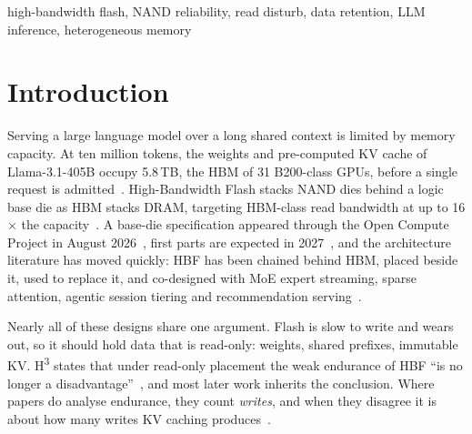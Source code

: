 \documentclass[conference,10pt]{IEEEtran}
\newcommand{\Hthree}{H\textsuperscript{3}}
\begin{document}
\begin{IEEEkeywords}
high-bandwidth flash, NAND reliability, read disturb, data retention, LLM
inference, heterogeneous memory
\end{IEEEkeywords}

\section{Introduction}

Serving a large language model over a long shared context is limited by
memory capacity. At ten million tokens, the weights and pre-computed KV cache
of Llama-3.1-405B occupy 5.8\,TB, the HBM of 31 B200-class GPUs, before a single
request is admitted~\cite{ha2026h3}. High-Bandwidth Flash stacks NAND dies behind
a logic base die as HBM stacks DRAM, targeting HBM-class read bandwidth at up to
16$\times$ the capacity~\cite{sandisk2025hbf,ma2026challenges}. A base-die
specification appeared through the Open Compute Project in August
2026~\cite{ocp2026hbf}, first parts are expected in 2027~\cite{hu2026hbfsim}, and
the architecture literature has moved quickly: HBF has been chained behind HBM,
placed beside it, used to replace it, and co-designed with MoE expert streaming,
sparse attention, agentic session tiering and recommendation
serving~\cite{ha2026h3,park2026pooling,atassi2026hma,baek2026hotcold,son2026exploring,kyung2026hbfkv,peng2026grhbf,wang2026flashaccel,oliveira2026flint,kim2026dash,zhong2026hbflex,li2026hbfsucks,jonnalagadda2026splash,yin2026hbfapps,xia2026moebox}.

Nearly all of these designs share one argument. Flash is slow to write and wears
out, so it should hold data that is read-only: weights, shared prefixes,
immutable KV. \Hthree{} states that under read-only placement the weak endurance
of HBF ``is no longer a disadvantage''~\cite{ha2026h3}, and most later work
inherits the conclusion. Where papers do analyse endurance, they count
\emph{writes}, and when they disagree it is about how many writes KV caching
produces~\cite{son2026exploring,kyung2026hbfkv,baek2026hotcold,kim2026dash,wang2026flashaccel}.
\end{document}
